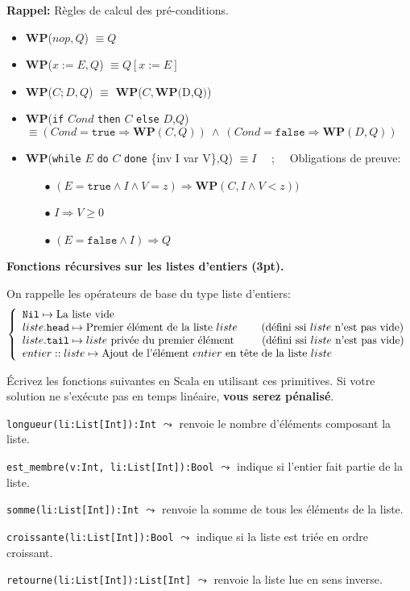 \documentclass[10pt]{article}\usepackage[nu]{esial}
\newcommand{\WP}[1]{\textbf{WP}($#1$)}
\begin{document}
\medskip\noindent\textbf{Rappel:} Règles de calcul des pré-conditions.

\begin{itemize}
\item \WP{nop, Q}  $\equiv Q$
\item \WP{x:=E, Q} $\equiv Q[x:=E]$
\item \WP{C;D, Q}  $\equiv$ \WP{C, \WP{D,Q}}
\item \textbf{WP}(\texttt{if} $Cond$ \texttt{then} $C$ \texttt{else} $D$,$Q$)
  $\equiv (Cond=\mathtt{true}\Rightarrow \mathbf{WP}(C,Q))~\wedge~
          (Cond=\mathtt{false}\Rightarrow \mathbf{WP}(D,Q))$
\item \textbf{WP}(\texttt{while} $E$ \texttt{do} $C$ \texttt{done} \{inv I var
  V\},Q)  $\equiv I$ ~~;~~  Obligations de preuve:
  \begin{enumerate}
  \item[$\bullet$] $(E=\mathtt{true}\wedge I\wedge V=z) \Rightarrow
    \mathbf{WP}(C,I\wedge V<z))$
  \item[$\bullet$] $I\Rightarrow V\geq 0$
  \item[$\bullet$] $(E=\mathtt{false}\wedge I) \Rightarrow Q$
  \end{enumerate}
\end{itemize}

\bigskip
\Exercice \textbf{Fonctions récursives sur les listes d'entiers (3pt).}

On rappelle les opérateurs de base du type liste d'entiers:
$$\left\{
\begin{array}{l}
  \mathtt{Nil}  \mapsto \text{La liste vide}\\
  liste\mathtt{.head} \mapsto \text{Premier élément de la liste } liste
    \;\;\;\;\;\;\;\;\text{(défini ssi } liste \text{ n'est pas vide)}\\
  liste\mathtt{.tail} \mapsto liste \text{ privée du premier élément}
    \text{\hspace{9mm}(défini ssi } liste \text{ n'est pas vide)}\\
  entier \;\mathtt{::}\; liste \mapsto \text{Ajout de l'élément } entier 
    \text{ en tête de la liste } liste
\end{array}\right.
$$

Écrivez les fonctions suivantes en Scala en utilisant ces primitives. Si votre
solution ne s'exécute pas en temps linéaire, \textbf{vous serez pénalisé}.

\Question %
\texttt{longueur(li:List[Int]):Int} $\leadsto$ 
renvoie le nombre d'éléments composant la liste.

\Question %
\texttt{est\_membre(v:Int, li:List[Int]):Bool} $\leadsto$ 
indique si l'entier fait partie de la liste.

\Question %
\texttt{somme(li:List[Int]):Int} $\leadsto$ 
renvoie la somme de tous les éléments de la liste.

\Question %
\texttt{croissante(li:List[Int]):Bool} $\leadsto$
indique si la liste est triée en ordre croissant.

\Question %
\texttt{retourne(li:List[Int]):List[Int]} $\leadsto$
renvoie la liste lue en sens inverse.
\end{document}
